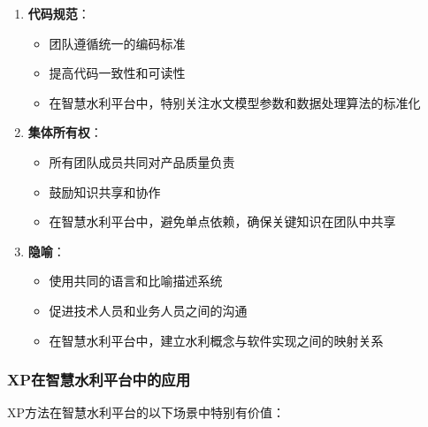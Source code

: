 \begin{enumerate}
\def\labelenumi{\arabic{enumi}.}
\setcounter{enumi}{9}
\tightlist
\item
  \textbf{代码规范}：

  \begin{itemize}
  \tightlist
  \item
    团队遵循统一的编码标准
  \item
    提高代码一致性和可读性
  \item
    在智慧水利平台中，特别关注水文模型参数和数据处理算法的标准化
  \end{itemize}
\item
  \textbf{集体所有权}：

  \begin{itemize}
  \tightlist
  \item
    所有团队成员共同对产品质量负责
  \item
    鼓励知识共享和协作
  \item
    在智慧水利平台中，避免单点依赖，确保关键知识在团队中共享
  \end{itemize}
\item
  \textbf{隐喻}：

  \begin{itemize}
  \tightlist
  \item
    使用共同的语言和比喻描述系统
  \item
    促进技术人员和业务人员之间的沟通
  \item
    在智慧水利平台中，建立水利概念与软件实现之间的映射关系
  \end{itemize}
\end{enumerate}

\subsubsection{XP在智慧水利平台中的应用}\label{xpux5728ux667aux6167ux6c34ux5229ux5e73ux53f0ux4e2dux7684ux5e94ux7528}

XP方法在智慧水利平台的以下场景中特别有价值：

